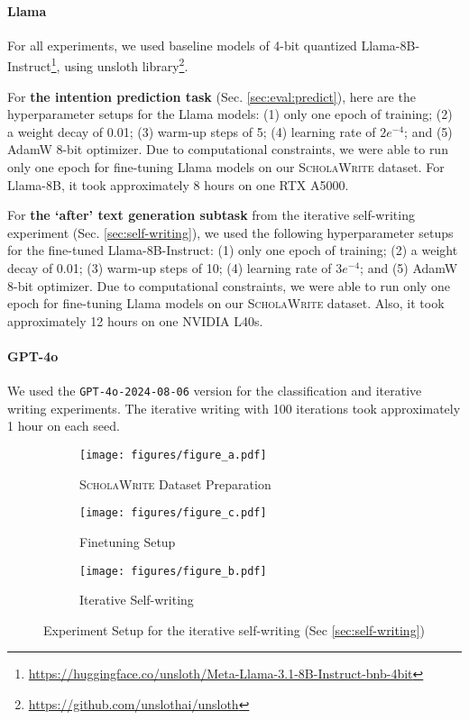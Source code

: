 \paragraph{Llama} For all experiments, we used baseline models of 4-bit quantized  Llama-8B-Instruct\footnote{\url{https://huggingface.co/unsloth/Meta-Llama-3.1-8B-Instruct-bnb-4bit}}, using unsloth library\footnote{\url{https://github.com/unslothai/unsloth}}. 


For \textbf{the intention prediction task} (Sec. \ref{sec:eval:predict}), here are the hyperparameter setups for the Llama models: (1) only one epoch of training; (2) a weight decay of 0.01; (3) warm-up steps of 5; (4) learning rate of $2e^{-4}$; and (5) AdamW 8-bit optimizer. Due to computational constraints, we were able to run only one epoch for fine-tuning Llama models on our \textsc{ScholaWrite} dataset. 
For Llama-8B, it took approximately 8 hours on one RTX A5000. 

For \textbf{the `after' text generation subtask} from the iterative self-writing experiment (Sec. \ref{sec:self-writing}), we used the following hyperparameter setups for the fine-tuned Llama-8B-Instruct: (1) only one epoch of training; (2) a weight decay of 0.01; (3) warm-up steps of 10; (4) learning rate of $3e^{-4}$; and (5) AdamW 8-bit optimizer. Due to computational constraints, we were able to run only one epoch for fine-tuning Llama models on our \textsc{ScholaWrite} dataset. Also, it took approximately 12 hours on one NVIDIA L40s. 

\paragraph{GPT-4o} We used the \texttt{GPT-4o-2024-08-06} version for the classification and iterative writing experiments. 
The iterative writing with 100 iterations took approximately 1 hour on each seed.  

\begin{figure*}
    \centering
    \begin{subfigure}{0.55\textwidth}
        \texttt{[image: figures/figure\_a.pdf]}
        \caption{\textsc{ScholaWrite} Dataset Preparation}
    \end{subfigure}
    \begin{subfigure}{0.45\textwidth}
        \texttt{[image: figures/figure\_c.pdf]}
        \caption{Finetuning Setup}
    \end{subfigure}
    \begin{subfigure}{0.53\textwidth}
        \texttt{[image: figures/figure\_b.pdf]}
        \caption{Iterative Self-writing}
    \end{subfigure}
    \caption{Experiment Setup for the iterative self-writing (Sec \ref{sec:self-writing})}
    \label{fig:iteartive-writing-setup-detail}
\end{figure*}

